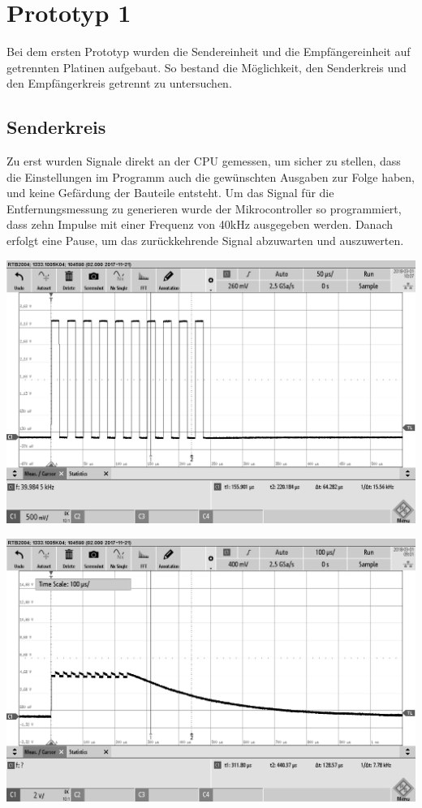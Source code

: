 \section{Prototyp 1}
Bei dem ersten Prototyp wurden die Sendereinheit und die Empfängereinheit auf getrennten Platinen aufgebaut. So bestand die Möglichkeit, den Senderkreis und den Empfängerkreis getrennt zu untersuchen.

\subsection{Senderkreis}
Zu erst wurden Signale direkt an der CPU gemessen, um sicher zu stellen, dass die Einstellungen im Programm auch die gewünschten Ausgaben zur Folge haben, und keine Gefärdung der Bauteile entsteht.
Um das Signal für die Entfernungsmessung zu generieren wurde der Mikrocontroller so programmiert, dass zehn Impulse mit einer Frequenz von 40kHz ausgegeben werden. Danach erfolgt eine Pause, um das zurückkehrende Signal abzuwarten und auszuwerten.\\
\begin{minipage}{0.5\textwidth}
\includegraphics[width=1\textwidth%
]{Abbildungen/MessungenP1/PWM-von-der-cpu.png}
\label{fig:pwm-burst}
\end{minipage}
\begin{minipage}{0.5\textwidth}
\includegraphics[width=1\textwidth%
]{Abbildungen/MessungenP1/PWM-ausgabe-mit-Hi-Side.png}
\label{fig:HiSide}
\end{minipage}
